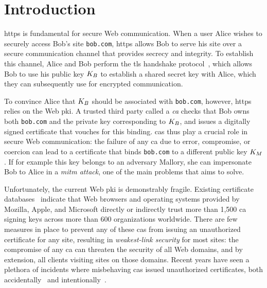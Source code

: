 \section{Introduction}
\label{sec:intro}

\acs{https} is fundamental for secure Web communication. When a user Alice
wishes to securely access Bob's site \texttt{bob.com}, \ac{https} allows Bob to
serve his site over a secure communication channel that provides secrecy and
integrity. To establish this channel, Alice and Bob perform the \ac{tls}
handshake protocol~\cite{rfc8446}, which allows Bob to use his public key
$K_B$ to establish a shared secret key with Alice, which they can subsequently
use for encrypted communication.

To convince Alice that $K_B$ should be associated with \texttt{bob.com},
however, \ac{https} relies on the Web \ac{pki}. A trusted third party called a
\emph{\ac{ca}} checks that Bob owns both \texttt{bob.com} and the private key
corresponding to $K_B$, and
issues a digitally signed certificate that vouches for this binding. \acp{ca}
thus play a crucial role in secure Web communication: the failure of any \ac{ca}
due to error, compromise, or coercion can lead to a certificate that binds
\texttt{bob.com} to a different public key $K_M$. If for example this key
belongs to an adversary Mallory, she can impersonate Bob to Alice in a
\emph{\ac{mitm} attack}, one of the main problems that  aims to solve.

Unfortunately, the current Web \ac{pki} is demonstrably fragile. Existing
certificate databases~\cite{durumeric2015search, rfc6962} indicate that Web
browsers and operating systems provided by Mozilla, Apple, and Microsoft
directly or indirectly trust more than 1,500 \ac{ca} signing keys across more
than 600 organizations worldwide. There are few measures in place to prevent any
of these \acp{ca} from issuing an unauthorized certificate for any site,
resulting in \emph{weakest-link security} for most sites: the compromise of any
\ac{ca} can threaten the security of all Web domains, and by extension, all
clients visiting sites on those domains. Recent years have seen a plethora of
incidents where misbehaving \acp{ca} issued unauthorized certificates, both
accidentally~\cite{sleevi2015sustaining} and
intentionally~\cite{valsorda2015komodia}.

